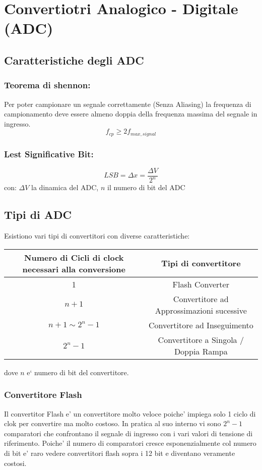 \documentclass[\main/main.tex]{subfiles}
\begin{document}
\clearpage
\section{Convertiotri Analogico - Digitale (ADC)}
\subsection{Caratteristiche degli ADC}

\subsubsection{Teorema di shennon:}
Per poter campionare un segnale correttamente (Senza Aliasing) la frequenza di campionamento deve essere almeno doppia della frequenza massima del segnale in ingresso.
\[f_{cp} \ge 2 f_{max,signal}\]

\subsubsection{Lest Significative Bit:}
\[LSB = \Delta x = \frac{\Delta V}{2^n} \]
con:
$\Delta V$ la dinamica del ADC,
 $n$ il numero di bit del ADC
\subsection{Tipi di ADC}

 Esistiono vari tipi di convertitori con diverse caratteristiche:

 \begin{tabular}{| c | c |}
 \hline
 Numero di Cicli di clock necessari alla conversione & Tipi di convertitore\\
 \hline
 1 & Flash Converter\\
 \hline
 $n+1$ & Convertitore ad Approssimazioni sucessive\\
 \hline
 $n+1 \sim 2^n-1$ & Convertitore ad Inseguimento\\
 \hline
 $2^n-1$ & Convertitore a Singola / Doppia Rampa\\
 \hline
 \end{tabular}

dove $n$  e` numero di bit del convertitore.

\subsubsection{Convertitore Flash}
Il convertitor Flash e' un convertitore molto veloce poiche' impiega solo 1 ciclo di clok per convertire ma molto costoso.
In pratica al suo interno vi sono $2^n - 1$ comparatori che confrontano il segnale di ingresso con i vari valori di tensione di riferimento.
Poiche' il numero di comparatori cresce esponenzialmente col numero di bit e' raro vedere convertitori flash sopra i 12 bit e diventano veramente costosi.
\end{document}
